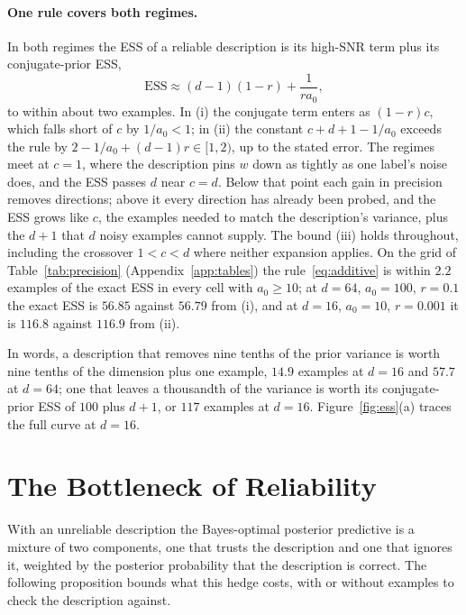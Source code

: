\documentclass[10pt]{article}
\newcommand{\ess}{\mathrm{ESS}}
\begin{document}
\paragraph{One rule covers both regimes.}
In both regimes the ESS of a reliable description is its high-SNR term plus its conjugate-prior ESS,
\begin{equation}\label{eq:additive}
\ess \approx (d-1)(1-r) + \frac{1}{r a_0},
\end{equation}
to within about two examples. In (i) the conjugate term enters as $(1-r)c$, which falls short of $c$ by $1/a_0 < 1$; in (ii) the constant $c + d + 1 - 1/a_0$ exceeds the rule by $2 - 1/a_0 + (d-1)r \in [1, 2)$, up to the stated error. The regimes meet at $c = 1$, where the description pins $w$ down as tightly as one label's noise does, and the ESS passes $d$ near $c = d$. Below that point each gain in precision removes directions; above it every direction has already been probed, and the ESS grows like $c$, the examples needed to match the description's variance, plus the $d + 1$ that $d$ noisy examples cannot supply. The bound (iii) holds throughout, including the crossover $1 < c < d$ where neither expansion applies. On the grid of Table~\ref{tab:precision} (Appendix~\ref{app:tables}) the rule~\eqref{eq:additive} is within $2.2$ examples of the exact ESS in every cell with $a_0 \ge 10$; at $d = 64$, $a_0 = 100$, $r = 0.1$ the exact ESS is $56.85$ against $56.79$ from (i), and at $d = 16$, $a_0 = 10$, $r = 0.001$ it is $116.8$ against $116.9$ from (ii).

In words, a description that removes nine tenths of the prior variance is worth nine tenths of the dimension plus one example, $14.9$ examples at $d = 16$ and $57.7$ at $d = 64$; one that leaves a thousandth of the variance is worth its conjugate-prior ESS of $100$ plus $d + 1$, or $117$ examples at $d = 16$. Figure~\ref{fig:ess}(a) traces the full curve at $d = 16$.

\section{The Bottleneck of Reliability}\label{sec:reliability}

With an unreliable description the Bayes-optimal posterior predictive is a mixture of two components, one that trusts the description and one that ignores it, weighted by the posterior probability that the description is correct. The following proposition bounds what this hedge costs, with or without examples to check the description against.
\end{document}
